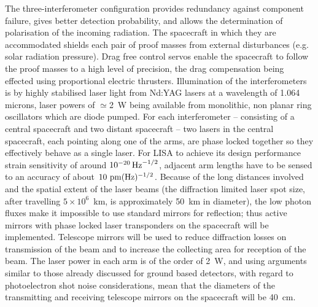\documentclass{article}
\begin{document}

The three-interferometer configuration provides redundancy against component
failure, gives better detection probability, and allows the determination of
polarisation of the incoming radiation. The spacecraft in which they are
accommodated shields each pair of proof masses from external disturbances (e.g.
solar radiation pressure). Drag free control servos enable the spacecraft to
follow the proof masses to a high level of precision, the drag compensation
being effected using proportional electric thrusters. Illumination of the
interferometers is by highly stabilised laser light from Nd:YAG lasers at a
wavelength of 1.064 microns, laser powers of $\simeq$2~W being available from
monolithic, non planar ring oscillators which are diode pumped. For each
interferometer -- consisting of a central spacecraft and two distant spacecraft
-- two lasers in the central spacecraft, each pointing along one of the arms,
are phase locked together so they effectively behave as a single laser. For LISA
to achieve its design performance strain sensitivity of around 
$10^{-20}\,{\rm Hz}^{-1/2}$, adjacent arm lengths have to be sensed to an
accuracy of about $10 {\rm \ pm}(\rm Hz)^{-1/2}$. Because of the long
distances involved and the spatial extent of the laser beams (the diffraction
limited laser spot size, after travelling $5\times10^{6}$~km, is approximately
50~km in diameter), the low photon fluxes make it impossible to use standard
mirrors for reflection; thus active mirrors with phase locked laser transponders
on the spacecraft will be implemented. Telescope mirrors will be used to reduce
diffraction losses on transmission of the beam and to increase the collecting
area for reception of the beam. The laser power in each arm is of the order of 
2~W, and using arguments similar to those already discussed for ground based 
detectors, with regard to photoelectron shot noise considerations, mean that 
the diameters of the transmitting and receiving telescope mirrors on the 
spacecraft will be 40~cm.  
\end{document}
